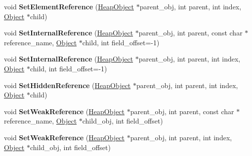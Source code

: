 \begin{DoxyCompactItemize}
\item 
void {\bfseries Set\+Element\+Reference} (\hyperlink{classv8_1_1internal_1_1_heap_object}{Heap\+Object} $\ast$parent\+\_\+obj, int parent, int index, \hyperlink{classv8_1_1internal_1_1_object}{Object} $\ast$child)\hypertarget{classv8_1_1internal_1_1_v8_heap_explorer_a51e33967f89c7ce4201c15a91b8451a8}{}\label{classv8_1_1internal_1_1_v8_heap_explorer_a51e33967f89c7ce4201c15a91b8451a8}

\item 
void {\bfseries Set\+Internal\+Reference} (\hyperlink{classv8_1_1internal_1_1_heap_object}{Heap\+Object} $\ast$parent\+\_\+obj, int parent, const char $\ast$reference\+\_\+name, \hyperlink{classv8_1_1internal_1_1_object}{Object} $\ast$child, int field\+\_\+offset=-\/1)\hypertarget{classv8_1_1internal_1_1_v8_heap_explorer_a3e02281ccc15f44557b6da7e1988db26}{}\label{classv8_1_1internal_1_1_v8_heap_explorer_a3e02281ccc15f44557b6da7e1988db26}

\item 
void {\bfseries Set\+Internal\+Reference} (\hyperlink{classv8_1_1internal_1_1_heap_object}{Heap\+Object} $\ast$parent\+\_\+obj, int parent, int index, \hyperlink{classv8_1_1internal_1_1_object}{Object} $\ast$child, int field\+\_\+offset=-\/1)\hypertarget{classv8_1_1internal_1_1_v8_heap_explorer_a3a7c4bdef53c5ded1b5bb87436509548}{}\label{classv8_1_1internal_1_1_v8_heap_explorer_a3a7c4bdef53c5ded1b5bb87436509548}

\item 
void {\bfseries Set\+Hidden\+Reference} (\hyperlink{classv8_1_1internal_1_1_heap_object}{Heap\+Object} $\ast$parent\+\_\+obj, int parent, int index, \hyperlink{classv8_1_1internal_1_1_object}{Object} $\ast$child)\hypertarget{classv8_1_1internal_1_1_v8_heap_explorer_aa007ebd987ca61c4b71fc24ece94777d}{}\label{classv8_1_1internal_1_1_v8_heap_explorer_aa007ebd987ca61c4b71fc24ece94777d}

\item 
void {\bfseries Set\+Weak\+Reference} (\hyperlink{classv8_1_1internal_1_1_heap_object}{Heap\+Object} $\ast$parent\+\_\+obj, int parent, const char $\ast$reference\+\_\+name, \hyperlink{classv8_1_1internal_1_1_object}{Object} $\ast$child\+\_\+obj, int field\+\_\+offset)\hypertarget{classv8_1_1internal_1_1_v8_heap_explorer_a4391532273c92c332694fa5287ac475f}{}\label{classv8_1_1internal_1_1_v8_heap_explorer_a4391532273c92c332694fa5287ac475f}

\item 
void {\bfseries Set\+Weak\+Reference} (\hyperlink{classv8_1_1internal_1_1_heap_object}{Heap\+Object} $\ast$parent\+\_\+obj, int parent, int index, \hyperlink{classv8_1_1internal_1_1_object}{Object} $\ast$child\+\_\+obj, int field\+\_\+offset)\hypertarget{classv8_1_1internal_1_1_v8_heap_explorer_ab41bd28ea4bb61a3c00b7b16c3207c92}{}\label{classv8_1_1internal_1_1_v8_heap_explorer_ab41bd28ea4bb61a3c00b7b16c3207c92}


\end{DoxyCompactItemize}
